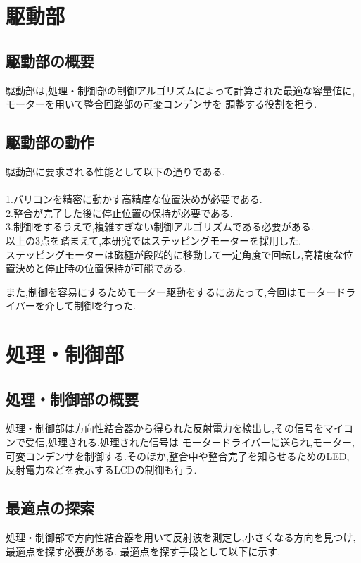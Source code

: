 \documentclass[uplatex, 12pt]{ujbook}
\begin{document}
\section{駆動部}
 \subsection{駆動部の概要}
 駆動部は,処理・制御部の制御アルゴリズムによって計算された最適な容量値に,モーターを用いて整合回路部の可変コンデンサを
調整する役割を担う.\\
 \subsection{駆動部の動作}
 駆動部に要求される性能として以下の通りである.\\\\
1.バリコンを精密に動かす高精度な位置決めが必要である.\\
2.整合が完了した後に停止位置の保持が必要である.\\
3.制御をするうえで,複雑すぎない制御アルゴリズムである必要がある.\\

以上の3点を踏まえて,本研究ではステッピングモーターを採用した.\\
ステッピングモーターは磁極が段階的に移動して一定角度で回転し,高精度な位置決めと停止時の位置保持が可能である.

また,制御を容易にするためモーター駆動をするにあたって,今回はモータードライバーを介して制御を行った.
\section{処理・制御部}
 \subsection{処理・制御部の概要}
処理・制御部は方向性結合器から得られた反射電力を検出し,その信号をマイコンで受信,処理される.処理された信号は
モータードライバーに送られ,モーター,可変コンデンサを制御する.そのほか,整合中や整合完了を知らせるためのLED,
反射電力などを表示するLCDの制御も行う.
 \subsection{最適点の探索}
処理・制御部で方向性結合器を用いて反射波を測定し,小さくなる方向を見つけ,最適点を探す必要がある.
最適点を探す手段として以下に示す.\\
\end{document}
